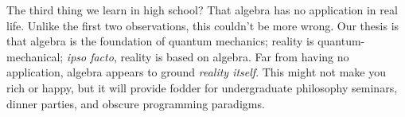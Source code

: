 The third thing we learn in high school? That algebra has no application in
real life. Unlike the first two observations, this couldn't be
more wrong. Our thesis is that algebra is the foundation of quantum
mechanics; reality is quantum-mechanical; \emph{ipso facto}, reality
is based on algebra. Far from having no application,
algebra appears to ground \emph{reality itself}.
This might not make you rich or happy, but it will provide fodder
for undergraduate philosophy seminars, dinner parties, and obscure
programming paradigms.